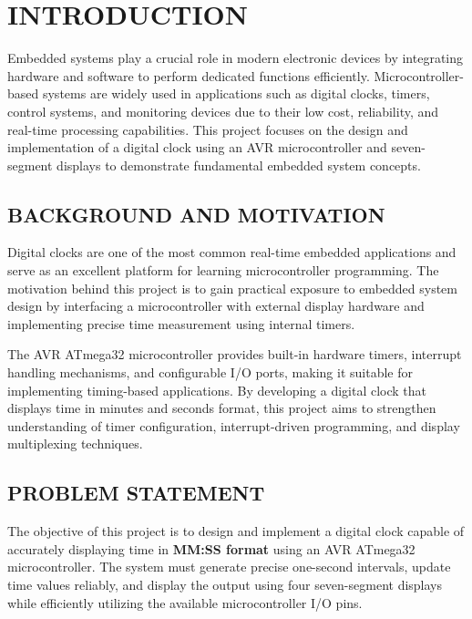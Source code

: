 \chapter{INTRODUCTION}%
\label{chap:introduction}

Embedded systems play a crucial role in modern electronic devices by integrating hardware and 
software to perform dedicated functions efficiently. Microcontroller-based systems are widely 
used in applications such as digital clocks, timers, control systems, and monitoring devices 
due to their low cost, reliability, and real-time processing capabilities. This project focuses 
on the design and implementation of a digital clock using an AVR microcontroller and 
seven-segment displays to demonstrate fundamental embedded system concepts.

\section{BACKGROUND AND MOTIVATION}
Digital clocks are one of the most common real-time embedded applications and serve as an 
excellent platform for learning microcontroller programming. The motivation behind this project 
is to gain practical exposure to embedded system design by interfacing a microcontroller with 
external display hardware and implementing precise time measurement using internal timers.

The AVR ATmega32 microcontroller provides built-in hardware timers, interrupt handling 
mechanisms, and configurable I/O ports, making it suitable for implementing timing-based 
applications. By developing a digital clock that displays time in minutes and seconds format, 
this project aims to strengthen understanding of timer configuration, interrupt-driven 
programming, and display multiplexing techniques.

\section{PROBLEM STATEMENT}
The objective of this project is to design and implement a digital clock capable of accurately 
displaying time in \textbf{MM:SS format} using an 
AVR ATmega32 microcontroller. The system must 
generate precise one-second intervals, update time values reliably, and display the output 
using four seven-segment displays while efficiently utilizing the available microcontroller I/O 
pins.

